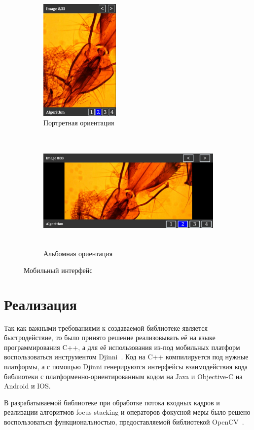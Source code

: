 \documentclass[14pt]{matmex-diploma-custom}
\begin{document}
\begin{figure}[h]
    \begin{subfigure}{.25\textwidth}
        \centering
        \includegraphics[width=.9\linewidth,height=6cm]{figures/comparasion2.png}
        \caption{Портретная ориентация}
        \label{fig:sfig1}
    \end{subfigure}
    \begin{subfigure}{.75\textwidth}
        \centering
        \includegraphics[width=.9\linewidth,height=6cm]{figures/comparasion3.png}
        \caption{Альбомная ориентация}
        \label{fig:sfig2}
    \end{subfigure}
    \caption{Мобильный интерфейс}
    \label{comparation2}
\end{figure}

\section{Реализация}

Так как важными требованиями к создаваемой библиотеке является быстродействие, то было принято решение реализовывать её на языке программирования C++, а для её использования из-под мобильных платформ воспользоваться инструментом Djinni~\cite{Djinni}. Код на C++ компилируется под нужные платформы, а с помощью Djinni генерируются интерфейсы взаимодействия кода библиотеки с платформенно-ориентированным кодом на Java и Objective-C на Android и IOS. 
\par
В разрабатываемой библиотеке при обработке потока входных кадров и реализации алгоритмов focus stacking и операторов фокусной меры было решено воспользоваться функциональностью, предоставляемой библиотекой OpenCV~\cite{OpenCV}.
\end{document}

